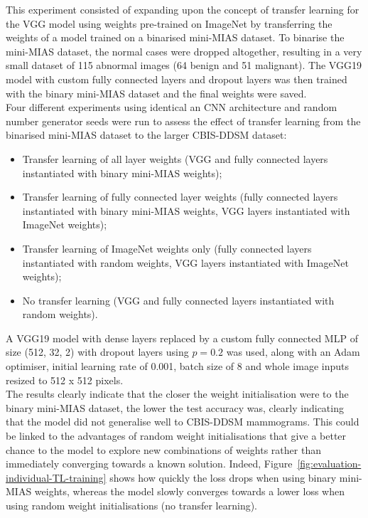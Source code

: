 This experiment consisted of expanding upon the concept of transfer learning for the VGG model using weights pre-trained on ImageNet by transferring the weights of a model trained on a binarised mini-MIAS dataset. To binarise the mini-MIAS dataset, the normal cases were dropped altogether, resulting in a very small dataset of 115 abnormal images (64 benign and 51 malignant). The VGG19 model with custom fully connected layers and dropout layers was then trained with the binary mini-MIAS dataset and the final weights were saved.\\

Four different experiments using identical an CNN architecture and random number generator seeds were run to assess the effect of transfer learning from the binarised mini-MIAS dataset to the larger CBIS-DDSM dataset:
\begin{itemize}
    \item Transfer learning of all layer weights (VGG and fully connected layers instantiated with binary mini-MIAS weights);
    \item Transfer learning of fully connected layer weights (fully connected layers instantiated with binary mini-MIAS weights, VGG layers instantiated with ImageNet weights);
    \item Transfer learning of ImageNet weights only (fully connected layers instantiated with random weights, VGG layers instantiated with ImageNet weights);
    \item No transfer learning (VGG and fully connected layers instantiated with random weights).
\end{itemize}



A VGG19 model with dense layers replaced by a custom fully connected MLP of size (512, 32, 2) with dropout layers using $p=0.2$ was used, along with an Adam optimiser, initial learning rate of 0.001, batch size of 8 and whole image inputs resized to 512 x 512 pixels.\\

The results clearly indicate that the closer the weight initialisation were to the binary mini-MIAS dataset, the lower the test accuracy was, clearly indicating that the model did not generalise well to CBIS-DDSM mammograms. This could be linked to the advantages of random weight initialisations that give a better chance to the model to explore new combinations of weights rather than immediately converging towards a known solution. Indeed, Figure~\ref{fig:evaluation-individual-TL-training} shows how quickly the loss drops when using binary mini-MIAS weights, whereas the model slowly converges towards a lower loss when using random weight initialisations (no transfer learning).

